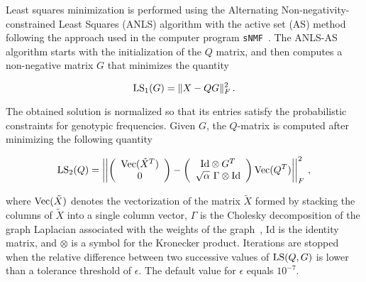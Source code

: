 Least squares minimization is performed using the Alternating Non-negativity-constrained Least Squares (ANLS) algorithm with the active set (AS) method following the approach used in the computer program {\tt sNMF}~\citep{frichot2014fast,kim2011fast}. The ANLS-AS algorithm starts with the initialization of the $Q$ matrix, and then computes a non-negative matrix $G$ that minimizes the quantity 

$${\rm LS}_1(G) = \|X - QG \|_F^2 \, .
$$


\noindent The obtained solution is normalized so that its entries satisfy the probabilistic constraints for genotypic frequencies. Given $G$, the $Q$-matrix is computed after minimizing the following quantity 
 
$${\rm LS}_2(Q) = 
\left|\left|
\left(
    \begin{array}{c}
      {\rm Vec}(\tilde{X}^T) \\
      0
    \end{array}
  \right)
   -  
   \left(
   \begin{array}{c}
      {\rm Id} \otimes G^T \\
      \sqrt{\alpha} ~ \Gamma \otimes {\rm Id}
    \end{array}
  \right) {\rm Vec}(Q^T)  
   \right|\right|_F^2
   \, ,
$$

\noindent where ${\rm Vec}(\tilde{X})$ denotes the vectorization of the matrix $\tilde{X}$ formed by stacking the columns of $\tilde{X}$ into a single column vector, $\Gamma$ is the Cholesky decomposition of the graph Laplacian associated with the weights of the graph~\citep{chung1997spectral}, Id is the identity matrix, and $\otimes$ is a symbol for the Kronecker product. Iterations are stopped when the relative difference between two successive values of ${\rm LS}(Q,G)$  is lower than a tolerance threshold of $\epsilon$. The default value for $\epsilon$ equals $10^{-7}$.